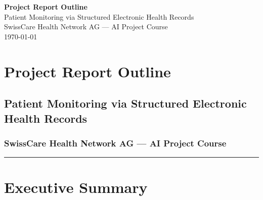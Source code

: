 \documentclass[11pt,a4paper]{article}
\begin{document}
\begin{titlepage}
\centering\vspace*{3cm}
{\Huge\bfseries\color{navyblue} Project Report Outline\\[0.5em]}
{\large\color{medblue} Patient Monitoring via Structured Electronic Health Records\\[2em]}
{\normalsize SwissCare Health Network AG --- AI Project Course}\\[0.5em]
{\small\today}
\end{titlepage}
\tableofcontents\newpage
\section{Project Report Outline}
\subsection{Patient Monitoring via Structured Electronic Health Records}
\subsubsection{SwissCare Health Network AG --- AI Project Course}

\noindent\rule{\linewidth}{0.4pt}

\section{Executive Summary}
\end{document}
